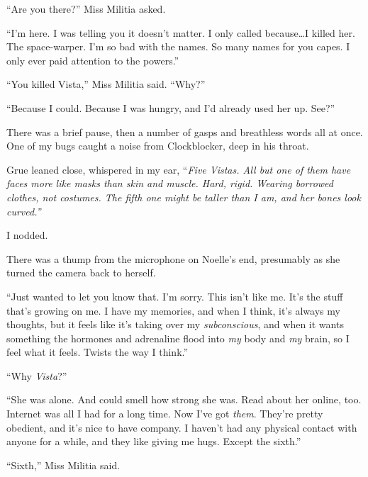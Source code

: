 ``Are you there?'' Miss Militia asked.



``I'm here.  I was telling you it doesn't matter.  I only called because\ldots I killed her.  The space-warper.  I'm so bad with the names.  So many names for you capes.  I only ever paid attention to the powers.''



``You killed Vista,'' Miss Militia said.  ``Why?''



``Because I could.  Because I was hungry, and I'd already used her up.  See?''



There was a brief pause, then a number of gasps and breathless words all at once.  One of my bugs caught a noise from Clockblocker, deep in his throat.



Grue leaned close, whispered in my ear, ``\emph{Five Vistas.  All but one of them have faces more like masks than skin and muscle.  Hard, rigid.  Wearing borrowed clothes, not costumes.  The fifth one might be taller than I am, and her bones look curved.''}



I nodded.



There was a thump from the microphone on Noelle's end, presumably as she turned the camera back to herself.



``Just wanted to let you know that.  I'm sorry.  This isn't like me.  It's the stuff that's growing on me.  I have my memories, and when I think, it's always my thoughts, but it feels like it's taking over my \emph{subconscious}, and when it wants something the hormones and adrenaline flood into \emph{my }body and \emph{my} brain, so I feel what it feels.  Twists the way I think.''



``Why \emph{Vista}?''



``She was alone.  And could smell how strong she was.  Read about her online, too.  Internet was all I had for a long time.  Now I've got \emph{them}.  They're pretty obedient, and it's nice to have company.  I haven't had any physical contact with anyone for a while, and they like giving me hugs.  Except the sixth.''



``Sixth,'' Miss Militia said.




